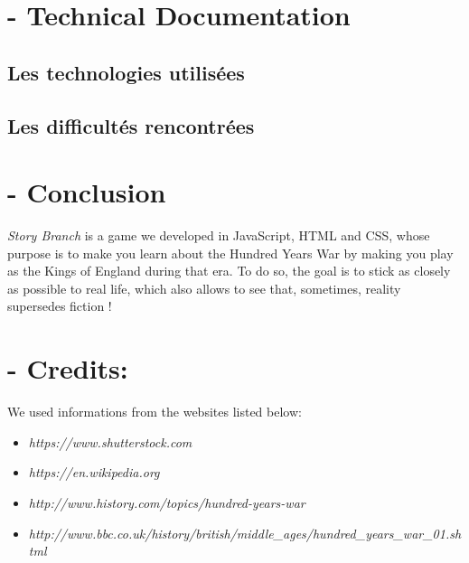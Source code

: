 \documentclass{scrreprt}
\begin{document}
{\let\clearpage\relax \chapter{- Technical Documentation}}

\section{Les technologies utilisées}

\section{Les difficultés rencontrées}

{\let\clearpage\relax \chapter{- Conclusion}}
\textit{Story Branch} is a game we developed in JavaScript, HTML and CSS, whose purpose is to make you learn about the Hundred Years War by making you play as the Kings of England during that era. To do so, the goal is to stick as closely as possible to real life, which also allows to see that, sometimes, reality supersedes fiction !


{\let\clearpage\relax \chapter{- Credits:}}

We used informations from the websites listed below:
\begin{itemize}
\item \textit{https://www.shutterstock.com}
\item \textit{https://en.wikipedia.org}
\item \textit{http://www.history.com/topics/hundred-years-war}
\item \textit{http://www.bbc.co.uk/history/british/middle_ages/hundred_years_war_01.shtml}
\end{itemize}
\end{document}
